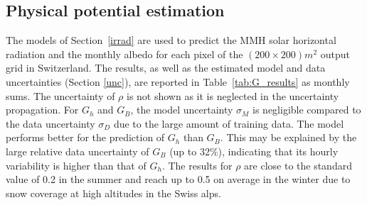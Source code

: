 \subsection{Physical potential estimation}
\label{phys}

The models of Section~\ref{irrad} are used to predict the MMH solar horizontal radiation and the monthly albedo for each pixel of the $(200\times200)m^2$ output grid in Switzerland. 
The results, as well as the estimated model and data uncertainties (Section \ref{unc}), are reported in Table~\ref{tab:G_results} as monthly sums. The uncertainty of $\rho$ is not shown as it is neglected in the uncertainty propagation.
For $G_h$ and $G_B$, the model uncertainty $\sigma_M$ is negligible compared to the data uncertainty $\sigma_D$ due to the large amount of training data.
The model performs better for the prediction of $G_h$ than $G_B$. This may be explained by the large relative data uncertainty of $G_B$ (up to 32\%), indicating that its hourly variability is higher than that of $G_h$. 
The results for $\rho$ are close to the standard value of 0.2 in the summer and reach up to 0.5 on average in the winter due to snow coverage at high altitudes in the Swiss alps.

